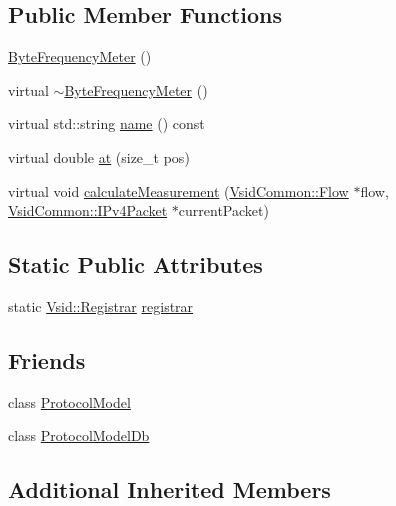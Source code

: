 \subsection*{Public Member Functions}
\begin{DoxyCompactItemize}
\item 
\hyperlink{class_vsid_1_1_byte_frequency_meter_a557409d77b4b57e042bcff9aa980ead4}{Byte\-Frequency\-Meter} ()
\item 
virtual \hyperlink{class_vsid_1_1_byte_frequency_meter_add780a07561235a96e015623fe31b1ce}{$\sim$\-Byte\-Frequency\-Meter} ()
\item 
virtual std\-::string \hyperlink{class_vsid_1_1_byte_frequency_meter_a84dda9598454a580bffa6ffb92e9c4a0}{name} () const 
\item 
virtual double \hyperlink{class_vsid_1_1_byte_frequency_meter_ab6541bcfde5db47e37fdfea6d43b36e5}{at} (size\-\_\-t pos)
\item 
virtual void \hyperlink{class_vsid_1_1_byte_frequency_meter_a643d288cee2dba77f32459db0c98b011}{calculate\-Measurement} (\hyperlink{class_vsid_common_1_1_flow}{Vsid\-Common\-::\-Flow} $\ast$flow, \hyperlink{class_vsid_common_1_1_i_pv4_packet}{Vsid\-Common\-::\-I\-Pv4\-Packet} $\ast$current\-Packet)
\end{DoxyCompactItemize}
\subsection*{Static Public Attributes}
\begin{DoxyCompactItemize}
\item 
static \hyperlink{class_vsid_1_1_registrar}{Vsid\-::\-Registrar} \hyperlink{class_vsid_1_1_byte_frequency_meter_a28b70dd183b9091db0532cbed2b44871}{registrar}
\end{DoxyCompactItemize}
\subsection*{Friends}
\begin{DoxyCompactItemize}
\item 
class \hyperlink{class_vsid_1_1_byte_frequency_meter_a80219b863d4ff3456933d16bc5f73f45}{Protocol\-Model}
\item 
class \hyperlink{class_vsid_1_1_byte_frequency_meter_a3c0d389e7a9476b06313d8fb9ca9fe68}{Protocol\-Model\-Db}
\end{DoxyCompactItemize}
\subsection*{Additional Inherited Members}


